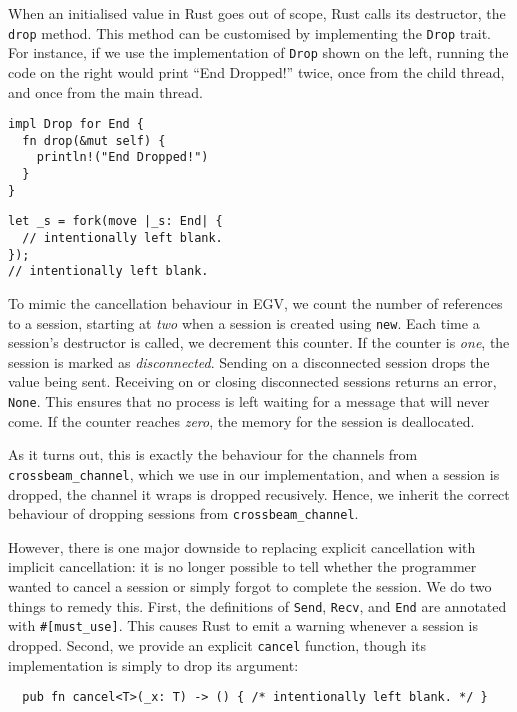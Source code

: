 \documentclass[copyright,creativecommons]{eptcs}
\begin{document}
When an initialised value in Rust goes out of scope, Rust calls its destructor, the \lstinline{drop} method. This method can be customised by implementing the \lstinline{Drop} trait. For instance, if we use the implementation of \lstinline{Drop} shown on the left, running the code on the right would print ``End Dropped!'' twice, once from the child thread, and once from the main thread.

\vspace{-0.5\baselineskip}
\begin{minipage}[t]{0.5\linewidth}
\begin{lstlisting}
impl Drop for End {
  fn drop(&mut self) {
    println!("End Dropped!")
  }
}
\end{lstlisting}
\end{minipage}%
\begin{minipage}[t]{0.5\linewidth}
\begin{lstlisting}
let _s = fork(move |_s: End| {
  // intentionally left blank.
});
// intentionally left blank.
\end{lstlisting}
\end{minipage}

\noindent
To mimic the cancellation behaviour in EGV, we count the number of references to a session, starting at \emph{two} when a session is created using \lstinline{new}. Each time a session's destructor is called, we decrement this counter. If the counter is \emph{one}, the session is marked as \emph{disconnected}. Sending on a disconnected session drops the value being sent. Receiving on or closing disconnected sessions returns an error, \ie \lstinline{None}. This ensures that no process is left waiting for a message that will never come. If the counter reaches \emph{zero}, the memory for the session is deallocated.

As it turns out, this is exactly the behaviour for the channels from \lstinline{crossbeam_channel}, which we use in our implementation, and when a session is dropped, the channel it wraps is dropped recusively. Hence, we inherit the correct behaviour of dropping sessions from \lstinline{crossbeam_channel}.

However, there is one major downside to replacing explicit cancellation with implicit cancellation: it is no longer possible to tell whether the programmer wanted to cancel a session or simply forgot to complete the session. We do two things to remedy this. First, the definitions of \lstinline{Send}, \lstinline{Recv}, and \lstinline{End} are annotated with \lstinline{#[must_use]}. This causes Rust to emit a warning whenever a session is dropped. Second, we provide an explicit \lstinline{cancel} function, though its implementation is simply to drop its argument:
\begin{lstlisting}
  pub fn cancel<T>(_x: T) -> () { /* intentionally left blank. */ }
\end{lstlisting}
\end{document}

